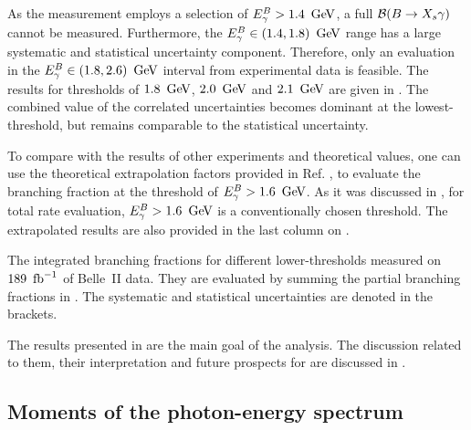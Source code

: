 As the measurement employs a selection of ${E^B_{\gamma}}>1.4~\mathrm{\,Ge\kern -0.1em V}$, a full $\mathcal{B}(\BtoXsgamma)$ cannot be measured.
Furthermore, the ${E^B_{\gamma}}\in(1.4,1.8)~\mathrm{\,Ge\kern -0.1em V}$ range has a large systematic and statistical uncertainty component.
Therefore, only an evaluation in the ${E^B_{\gamma}}\in(1.8,2.6)~\mathrm{\,Ge\kern -0.1em V}$ interval from experimental data is feasible.
The results for thresholds of $1.8~\mathrm{\,Ge\kern -0.1em V}$, $2.0~\mathrm{\,Ge\kern -0.1em V}$ and $2.1~\mathrm{\,Ge\kern -0.1em V}$ are given in .
The combined value of the correlated uncertainties becomes dominant at the lowest-\EB threshold, but remains comparable to the statistical uncertainty.

To compare with the results of other experiments and theoretical values,
one can use the theoretical extrapolation factors provided in Ref. \cite{Buchmuller:2005zv},
to evaluate the branching fraction at the threshold of ${E^B_{\gamma}}>1.6~\mathrm{\,Ge\kern -0.1em V}$.
As it was discussed in , for \BtoXsgamma total rate evaluation, ${E^B_{\gamma}}>1.6~\mathrm{\,Ge\kern -0.1em V}$ is a conventionally chosen threshold.
The extrapolated results are also provided in the last column on .

\begin{table}[htbp!]
    \centering
    \caption{\label{tab:integrated_branching_fractions}
    The integrated \BtoXsgamma branching fractions for different lower-\EB thresholds measured on $189~\mbox{\,fb}^{-1}$ of Belle~II data.
    They are evaluated by summing the partial branching fractions in .
    The systematic and statistical uncertainties are denoted in the brackets.
    }
    
\end{table}

The results presented in  are the main goal of the analysis.
The discussion related to them, their interpretation and future prospects for \BtoXsgamma are discussed in .



\subsection{Moments of the \safeBtoXsgamma photon-energy spectrum}\label{sec:spectrum_moments}

